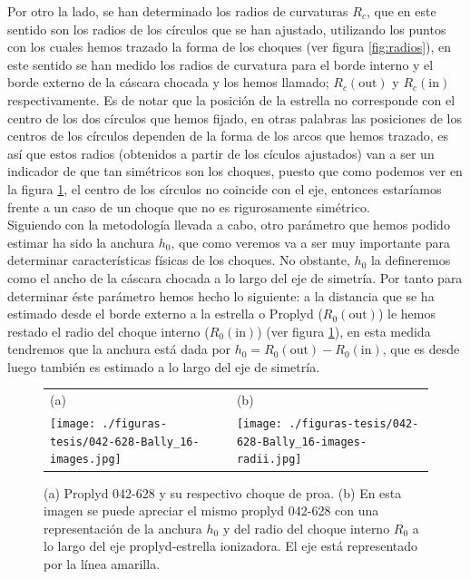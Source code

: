 \documentclass{article}
\newcommand\Out{\ensuremath{\mathrm{out}}}
\newcommand\In{\ensuremath{\mathrm{in}}}
\begin{document}
Por otro la lado, se han determinado los radios de curvaturas \(R_{c}\), que en este sentido son los radios de los círculos que se han ajustado, utilizando los puntos con los cuales hemos trazado la forma de los choques (ver figura \ref{fig:radios}), en este sentido se han medido los radios de curvatura para el borde interno y el borde externo de la cáscara chocada y los hemos llamado; \(R_{c}(\Out{})\) y \(R_{c}(\In{})\) respectivamente. Es de notar que la posición de la estrella no corresponde con el centro de los dos círculos que hemos fijado, en otras palabras las posiciones de los centros de los círculos dependen de la forma de los arcos que hemos trazado, es así que estos radios (obtenidos a partir de los cículos ajustados) van a ser un indicador de que tan simétricos son los choques, puesto que como podemos ver en la figura \ref{fig:anchura}, el centro de los círculos no coincide con el eje, entonces estaríamos frente a un caso de un choque que no es rigurosamente simétrico.\\

Siguiendo con la metodología llevada a cabo, otro parámetro que hemos podido estimar ha sido la anchura \(h_{0}\), que como veremos va a ser muy importante para determinar características físicas de los choques. No obstante, \(h_{0}\) la  defineremos como el ancho de la cáscara chocada a lo largo del eje de simetría. Por tanto para determinar éste parámetro hemos hecho lo siguiente: a la distancia que se ha estimado desde el borde externo a la estrella o Proplyd (\(R_{0}(\Out{})\)) le hemos restado el radio del choque interno (\(R_{0}(\In{})\)) (ver figura \ref{fig:anchura}), en esta medida tendremos que la anchura está dada por \(h_{0} = R_{0}(\text{out}) - R_{0}(\text{in})\), que es desde luego también es estimado a lo largo del eje de simetría.

\begin{figure}[htp]
\centering
\begin{tabular}{l l}
(a) & (b)  \\
  \texttt{[image: ./figuras-tesis/042-628-Bally\_16-images.jpg]}&
 \texttt{[image: ./figuras-tesis/042-628-Bally\_16-images-radii.jpg]}\\
\end{tabular}
\caption{(a) Proplyd 042-628 y su respectivo choque de proa. (b) En esta imagen se puede apreciar el mismo proplyd 042-628  con una representación de la anchura \(h_{0}\) y del radio del choque interno \(R_{0}\) a lo largo del eje proplyd-estrella ionizadora. El eje está representado por la línea amarilla.  }\label{fig:anchura}
\end{figure}
\end{document}
